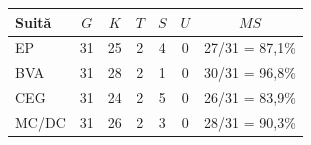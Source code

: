\begin{center}
\begingroup\small
\begin{tabular}{@{}lcccccc@{}}
\toprule
Suită & $G$ & $K$ & $T$ & $S$ & $U$ & $MS$ \\
\midrule
EP & 31 & 25 & 2 & 4 & 0 & 27/31 = 87,1\% \\
BVA & 31 & 28 & 2 & 1 & 0 & 30/31 = 96,8\% \\
CEG & 31 & 24 & 2 & 5 & 0 & 26/31 = 83,9\% \\
MC/DC & 31 & 26 & 2 & 3 & 0 & 28/31 = 90,3\% \\
\bottomrule
\end{tabular}
\endgroup
\end{center}
